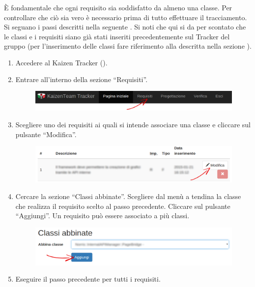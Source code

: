 					 \label{sec:ProgTracClasReq}
					È fondamentale che ogni requisito sia soddisfatto da almeno una classe. Per controllare che ciò sia vero è necessario prima di tutto effettuare il tracciamento. Si seguano i passi descritti nella seguente . Si noti che qui si da per scontato che le classi e i requisiti siano già stati inseriti precedentemente sul Tracker del gruppo (per l'inserimento delle classi fare riferimento alla  descritta nella sezione ).
					\begin{enumerate}
						\item Accedere al Kaizen  Tracker ().
						\item Entrare all'interno della sezione “Requisiti”.
						\begin{figure}[H]
							\centering
							\includegraphics[width=\textwidth]{Pics/HomePageMenuFrecciaReq}
						\end{figure}
						\item Scegliere uno dei requisiti ai quali si intende associare una classe e cliccare sul pulsante “Modifica”.
						\begin{figure}[H]
							\centering
							\includegraphics[width=\textwidth]{Pics/VistaRequisitoFrecciaModifica}
						\end{figure}
						\item Cercare la sezione “Classi abbinate”. Scegliere dal menù a tendina la classe che realizza il requisito scelto al passo precedente. Cliccare sul pulsante “Aggiungi”. Un requisito  può essere associato a più classi.
						\begin{figure}[H]
							\centering
							\includegraphics[width=\textwidth]{Pics/AbbinareClasseRequisito}
						\end{figure}
						\item Eseguire il passo precedente per tutti i requisiti.
					\end{enumerate}
